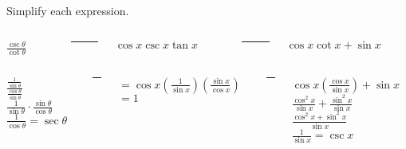 \begin{frame}{Simplify each expression.}
\begin{columns}
\begin{column}{0.2\textwidth}
\begin{center}
      $\frac{\csc\theta}{\cot\theta}$
\end{center}

\end{column}
\begin{column}{.02\textwidth}
        \rule{.1mm}{0.1\textheight}
    \end{column}
\begin{column}{0.4\textwidth}
   $\cos x \csc x \tan x$
\end{column}
\begin{column}{.02\textwidth}
        \rule{.1mm}{0.1\textheight}
    \end{column}
\begin{column}{0.4\textwidth}
   $\cos x \cot x + \sin x$
   \pause
\end{column}   
\end{columns}





\begin{columns}
\begin{column}{0.2\textwidth}
\begin{center}
      $\frac{\frac{1}{\sin\theta}}{\frac{\cos\theta}{\sin\theta}}$
      \\
      $\frac{1}{\sin\theta} \cdot \frac{\sin\theta}{\cos\theta} $
      \\
      $\frac{1}{\cos\theta} = \sec\theta$
\end{center}

\end{column}
\begin{column}{.02\textwidth}
        \rule{.1mm}{0.5\textheight}
        \pause
    \end{column}
\begin{column}{0.4\textwidth}
   $= \cos x (\frac{1}{\sin x}) (\frac{\sin x }{\cos x})$
   \\
   $= 1$
\end{column}
\begin{column}{.02\textwidth}
        \rule{.1mm}{0.5\textheight}
    \end{column}
\begin{column}{0.4\textwidth}
   $\cos x (\frac{\cos x}{\sin x})+ \sin x$
   \\
   $\frac{\cos^2 x}{\sin x} + \frac{\sin^2 x}{\sin x}$
   \\
   $\frac{\cos^2 x + \sin^2 x}{\sin x}$
   \\
   $\frac{1}{\sin x} = \csc x$
   \\
\end{column}   
\end{columns}
    
\end{frame}